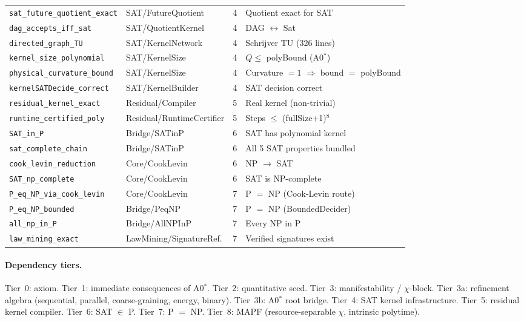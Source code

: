 \begin{center}
\begin{tabular}{@{}llcp{4.5cm}@{}}
\texttt{sat\_future\_quotient\_exact} & SAT/FutureQuotient & 4 & Quotient exact for SAT \\
\texttt{dag\_accepts\_iff\_sat} & SAT/QuotientKernel & 4 & DAG $\leftrightarrow$ Sat \\
\texttt{directed\_graph\_TU} & SAT/KernelNetwork & 4 & Schrijver TU (326 lines) \\
\texttt{kernel\_size\_polynomial} & SAT/KernelSize & 4 & $Q \leq$ polyBound (A0$^*$) \\
\texttt{physical\_curvature\_bound} & SAT/KernelSize & 4 & Curvature $= 1$ $\Rightarrow$ bound $=$ polyBound \\
\texttt{kernelSATDecide\_correct} & SAT/KernelBuilder & 4 & SAT decision correct \\
\texttt{residual\_kernel\_exact} & Residual/Compiler & 5 & Real kernel (non-trivial) \\
\texttt{runtime\_certified\_poly} & Residual/RuntimeCertifier & 5 & Steps $\leq$ (fullSize+1)$^8$ \\
\texttt{SAT\_in\_P} & Bridge/SATinP & 6 & SAT has polynomial kernel \\
\texttt{sat\_complete\_chain} & Bridge/SATinP & 6 & All 5 SAT properties bundled \\
\texttt{cook\_levin\_reduction} & Core/CookLevin & 6 & NP $\to$ SAT \\
\texttt{SAT\_np\_complete} & Core/CookLevin & 6 & SAT is NP-complete \\
\texttt{P\_eq\_NP\_via\_cook\_levin} & Core/CookLevin & 7 & P $=$ NP (Cook-Levin route) \\
\texttt{P\_eq\_NP\_bounded} & Bridge/PeqNP & 7 & P $=$ NP (BoundedDecider) \\
\texttt{all\_np\_in\_P} & Bridge/AllNPInP & 7 & Every NP in P \\
\texttt{law\_mining\_exact} & LawMining/SignatureRef. & 7 & Verified signatures exist \\
\hline
\end{tabular}
\end{center}

\paragraph{Dependency tiers.}
Tier~0: axiom.
Tier~1: immediate consequences of A0$^*$.
Tier~2: quantitative seed.
Tier~3: manifestability / $\chi$-block.
Tier~3a: refinement algebra (sequential, parallel, coarse-graining, energy, binary).
Tier~3b: A0$^*$ root bridge.
Tier~4: SAT kernel infrastructure.
Tier~5: residual kernel compiler.
Tier~6: SAT $\in$ P.
Tier~7: P $=$ NP.
Tier~8: MAPF (resource-separable $\chi$, intrinsic polytime).

